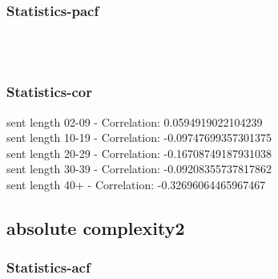 \documentclass{article}%
\begin{document}
%
\newpage%
\subsubsection{Statistics{-}pacf}%
\label{ssubsec:Statistics{-}pacf}%


\begin{figure}[ht]%
\centering%
\setlength{\abovecaptionskip}{-35pt}%
%
%
\\%
%
%
\\%
%
\end{figure}

%
\newpage%
\subsubsection{Statistics{-}cor}%
\label{ssubsec:Statistics{-}cor}%
\noindent%
sent length 02-09 - Correlation: 0.0594919022104239\\%
sent length 10-19 - Correlation: -0.09747699357301375\\%
sent length 20-29 - Correlation: -0.16708749187931038\\%
sent length 30-39 - Correlation: -0.09208355737817862\\%
sent length 40+ - Correlation: -0.32696064465967467\\

%
\newpage

%
\subsection{absolute complexity2}%
\label{subsec:absolutecomplexity2}%
\subsubsection{Statistics{-}acf}%
\label{ssubsec:Statistics{-}acf}%
\end{document}
